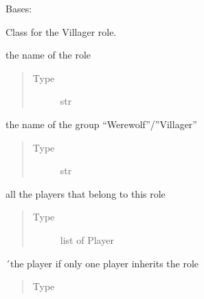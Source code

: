 \documentclass[letterpaper,10pt,english]{sphinxmanual}
\begin{document}
\begin{fulllineitems}
Bases: 

Class for the Villager role.


\begin{fulllineitems}
the name of the role
\begin{quote}\begin{description}
\item[{Type}] \leavevmode
str

\end{description}\end{quote}

\end{fulllineitems}



\begin{fulllineitems}
the name of the group “Werewolf”/”Villager”
\begin{quote}\begin{description}
\item[{Type}] \leavevmode
str

\end{description}\end{quote}

\end{fulllineitems}



\begin{fulllineitems}
all the players that belong to this role
\begin{quote}\begin{description}
\item[{Type}] \leavevmode
list of Player

\end{description}\end{quote}

\end{fulllineitems}



\begin{fulllineitems}
´the player if only one player inherits the role
\begin{quote}\begin{description}
\item[{Type}] \leavevmode
{\hyperref[\detokenize{chatwolf:chatwolf.player.Player}]{}}


\end{description}
\end{quote}
\end{fulllineitems}
\end{fulllineitems}
\end{document}
